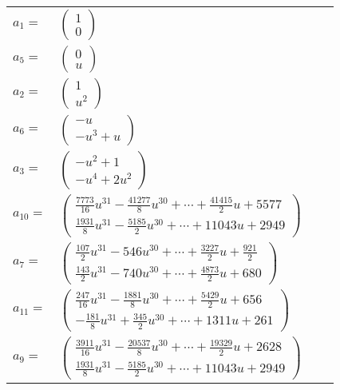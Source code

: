 \documentclass[1p]{elsarticle_modified}
\theoremstyle{definition}
\begin{document}
\begin{tabular}{m{7pt} m{180pt} m{7pt} m{180pt} }
\flushright $a_{1}=$&$\begin{pmatrix}1\\0\end{pmatrix}$ \\
\flushright $a_{5}=$&$\begin{pmatrix}0\\u\end{pmatrix}$ \\
\flushright $a_{2}=$&$\begin{pmatrix}1\\u^2\end{pmatrix}$ \\
\flushright $a_{6}=$&$\begin{pmatrix}- u\\- u^3+u\end{pmatrix}$ \\
\flushright $a_{3}=$&$\begin{pmatrix}- u^2+1\\- u^4+2 u^2\end{pmatrix}$ \\
\flushright $a_{10}=$&$\begin{pmatrix}\frac{7773}{16} u^{31}-\frac{41277}{8} u^{30}+\cdots+\frac{41415}{2} u+5577\\\frac{1931}{8} u^{31}-\frac{5185}{2} u^{30}+\cdots+11043 u+2949\end{pmatrix}$ \\
\flushright $a_{7}=$&$\begin{pmatrix}\frac{107}{2} u^{31}-546 u^{30}+\cdots+\frac{3227}{2} u+\frac{921}{2}\\\frac{143}{2} u^{31}-740 u^{30}+\cdots+\frac{4873}{2} u+680\end{pmatrix}$ \\
\flushright $a_{11}=$&$\begin{pmatrix}\frac{247}{16} u^{31}-\frac{1881}{8} u^{30}+\cdots+\frac{5429}{2} u+656\\-\frac{181}{8} u^{31}+\frac{345}{2} u^{30}+\cdots+1311 u+261\end{pmatrix}$ \\
\flushright $a_{9}=$&$\begin{pmatrix}\frac{3911}{16} u^{31}-\frac{20537}{8} u^{30}+\cdots+\frac{19329}{2} u+2628\\\frac{1931}{8} u^{31}-\frac{5185}{2} u^{30}+\cdots+11043 u+2949\end{pmatrix}$ \\

\end{tabular}
\end{document}
